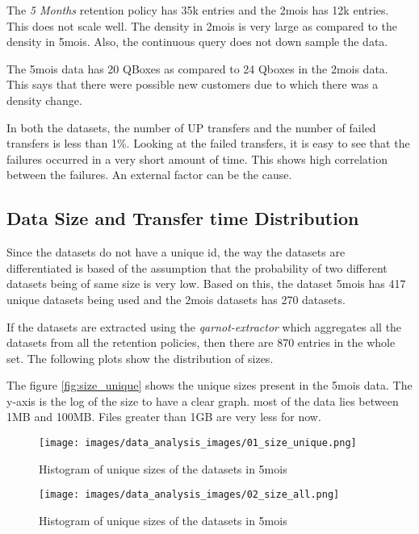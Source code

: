 The \textit{5 Months} retention policy has 35k entries and the 2mois has 12k entries. This does not scale well. The density in 2mois is very large as compared to the density in 5mois. Also, the continuous query does not down sample the data.

The 5mois data has 20 QBoxes as compared to 24 Qboxes in the 2mois data. This says that there were possible new customers due to which there was a density change.

In both the datasets, the number of UP transfers and the number of failed transfers is less than 1\%. Looking at the failed transfers, it is easy to see  that the failures occurred in a very short amount of time. This shows high correlation between the failures. An external factor can be the cause.

\subsection{Data Size and Transfer time Distribution}

Since the datasets do not have a unique id, the way the datasets are differentiated is based of the assumption that the probability of two different datasets being of same size is very low. Based on this, the dataset 5mois has 417 unique datasets being used and the 2mois datasets has 270 datasets.

If the datasets are extracted using the \textit{qarnot-extractor} which aggregates all the datasets from all the retention policies, then there are 870 entries in the whole set. The following plots show the distribution of sizes.

The figure \ref{fig:size_unique} shows the unique sizes present in the 5mois data. The y-axis is the log of the size to have a clear graph. most of the data lies between 1MB and 100MB. Files greater than 1GB are very less for now.

\begin{figure}[ht]
  \begin{minipage}[b]{0.5\linewidth}
    \centering
    \texttt{[image: images/data\_analysis\_images/01\_size\_unique.png]}
    \caption{Histogram of unique sizes of the datasets in 5mois}
    \label{fig:size_unique}
  \end{minipage}
  \hspace{0.5cm}
  \begin{minipage}[b]{0.5\linewidth}
    \centering
    \texttt{[image: images/data\_analysis\_images/02\_size\_all.png]}
    \caption{Histogram of unique sizes of the datasets in 5mois}
    \label{fig:size_all}
  \end{minipage}
\end{figure}


